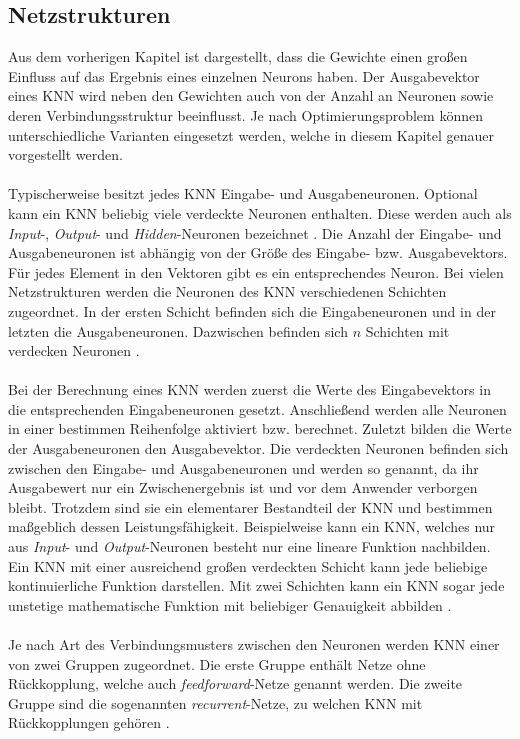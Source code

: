 \subsection{Netzstrukturen}
\label{subsec:network_structures}
Aus dem vorherigen Kapitel ist dargestellt, dass die Gewichte einen großen Einfluss auf das Ergebnis eines einzelnen Neurons haben. Der Ausgabevektor eines \ac{KNN} wird neben den Gewichten auch von der Anzahl an Neuronen sowie deren Verbindungsstruktur beeinflusst. Je nach Optimierungsproblem können unterschiedliche Varianten eingesetzt werden, welche in diesem Kapitel genauer vorgestellt werden. 
\\\\
Typischerweise besitzt jedes \ac{KNN} Eingabe- und Ausgabeneuronen. Optional kann ein \ac{KNN} beliebig viele verdeckte Neuronen enthalten. Diese werden auch als \emph{Input}-, \emph{Output}- und \emph{Hidden}-Neuronen bezeichnet \cite{zell2003simulation}. Die Anzahl der Eingabe- und Ausgabeneuronen ist abhängig von der Größe des Eingabe- bzw. Ausgabevektors. Für jedes Element in den Vektoren gibt es ein entsprechendes Neuron.
Bei vielen Netzstrukturen werden die Neuronen des \ac{KNN} verschiedenen Schichten zugeordnet. In der ersten Schicht befinden sich die Eingabeneuronen und in der letzten die Ausgabeneuronen. Dazwischen befinden sich $n$ Schichten mit verdecken Neuronen \cite{zell2003simulation}.
\\\\
Bei der Berechnung eines \ac{KNN} werden zuerst die Werte des Eingabevektors in die entsprechenden Eingabeneuronen gesetzt. Anschließend werden alle Neuronen in einer bestimmen Reihenfolge aktiviert bzw. berechnet. Zuletzt bilden die Werte der Ausgabeneuronen den Ausgabevektor. Die verdeckten Neuronen befinden sich zwischen den Eingabe- und Ausgabeneuronen und werden so genannt, da ihr Ausgabewert nur ein Zwischenergebnis ist und vor dem Anwender verborgen bleibt. Trotzdem sind sie ein elementarer Bestandteil der \ac{KNN} und bestimmen maßgeblich dessen Leistungsfähigkeit. Beispielweise kann ein \ac{KNN}, welches nur aus \emph{Input}- und \emph{Output}-Neuronen besteht nur eine lineare Funktion nachbilden. Ein \ac{KNN} mit einer ausreichend großen verdeckten Schicht kann jede beliebige kontinuierliche Funktion darstellen. Mit zwei Schichten kann ein \ac{KNN} sogar jede unstetige mathematische Funktion mit beliebiger Genauigkeit abbilden \cite{russell2013kunstliche}. 
\\\\
Je nach Art des Verbindungsmusters zwischen den Neuronen werden \ac{KNN} einer von zwei Gruppen zugeordnet. Die erste Gruppe enthält Netze ohne Rückkopplung, welche auch \emph{feedforward}-Netze genannt werden. Die zweite Gruppe sind die sogenannten \emph{recurrent}-Netze, zu welchen \ac{KNN} mit Rückkopplungen gehören \cite{zell2003simulation}.

